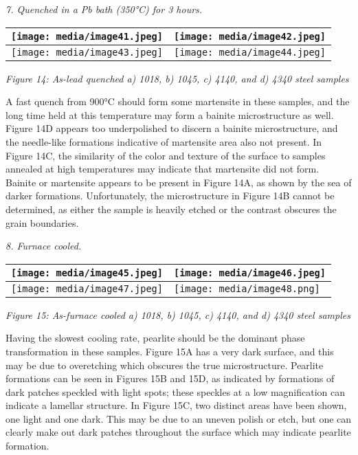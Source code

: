 \documentclass[]{article}
\begin{document}
\emph{7. Quenched in a Pb bath (350°C) for 3 hours.}

\begin{longtable}[]{@{}ll@{}}
\toprule
\texttt{[image: media/image41.jpeg]} &
\texttt{[image: media/image42.jpeg]}\tabularnewline
\midrule
\endhead
\texttt{[image: media/image43.jpeg]} &
\texttt{[image: media/image44.jpeg]}\tabularnewline
\bottomrule
\end{longtable}

\emph{Figure 14: As-lead quenched a) 1018, b) 1045, c) 4140, and d) 4340
steel samples}

A fast quench from 900°C should form some martensite in these samples,
and the long time held at this temperature may form a bainite
microstructure as well. Figure 14D appears too underpolished to discern
a bainite microstructure, and the needle-like formations indicative of
martensite area also not present. In Figure 14C, the similarity of the
color and texture of the surface to samples annealed at high
temperatures may indicate that martensite did not form. Bainite or
martensite appears to be present in Figure 14A, as shown by the sea of
darker formations. Unfortunately, the microstructure in Figure 14B
cannot be determined, as either the sample is heavily etched or the
contrast obscures the grain boundaries.

\emph{8. Furnace cooled.}

\begin{longtable}[]{@{}ll@{}}
\toprule
\texttt{[image: media/image45.jpeg]} &
\texttt{[image: media/image46.jpeg]}\tabularnewline
\midrule
\endhead
\texttt{[image: media/image47.jpeg]} &
\texttt{[image: media/image48.png]}\tabularnewline
\bottomrule
\end{longtable}

\emph{Figure 15: As-furnace cooled a) 1018, b) 1045, c) 4140, and d)
4340 steel samples}

Having the slowest cooling rate, pearlite should be the dominant phase
transformation in these samples. Figure 15A has a very dark surface, and
this may be due to overetching which obscures the true microstructure.
Pearlite formations can be seen in Figures 15B and 15D, as indicated by
formations of dark patches speckled with light spots; these speckles at
a low magnification can indicate a lamellar structure. In Figure 15C,
two distinct areas have been shown, one light and one dark. This may be
due to an uneven polish or etch, but one can clearly make out dark
patches throughout the surface which may indicate pearlite formation.
\end{document}
